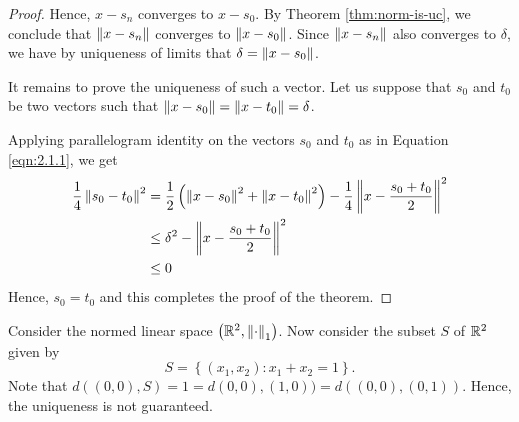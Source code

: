 \begin{proof}
     Hence, $x -s_{n}$ converges to $x- s_{0}$. By Theorem \ref{thm:norm-is-uc}, we conclude that $\left\lVert x-s_{n} \right\rVert$ converges to $\left\lVert x-s_0 \right\rVert$. Since $\left\lVert x-s_{n} \right\rVert$ also converges to $\delta$, we have by uniqueness of limits that $\delta = \left\lVert x-s_{0} \right\rVert$.

     It remains to prove the uniqueness of such a vector. Let us suppose that $s_0$ and $t_0$ be two vectors such that $\left\lVert x-s_{0} \right\rVert = \left\lVert x-t_{0} \right\rVert=\delta$.

     Applying parallelogram identity on the vectors $s_{0}$ and $t_0$ as in Equation \ref{eqn:2.1.1}, we get
\begin{align*}
	 \frac{1}{4} \left\lVert s_0 - t_0 \right\rVert^{2} &= \frac{1}{2} \left( \left\lVert x-s_{0} \right\rVert^{2} + \left\lVert x-t_0 \right\rVert^{2} \right) - \frac{1}{4} \left\lVert x - \frac{s_0 + t_0}{2} \right\rVert^{2} \\
	 & \le \delta^2 -  \left\lVert x - \frac{s_0 + t_0}{2} \right\rVert^{2} \\
	 & \le 0
     \end{align*}
     Hence, $s_0 = t_0$ and this completes the proof of the theorem.
\end{proof}

\begin{example} Consider the normed linear space $\left( \mathbb R ^{2}, \left\lVert \cdot \right\rVert _{1} \right)$. Now consider the subset $S$ of $\mathbb R ^2$ given by  $$S= \left\{ \left( x_{1} , x_{2} \right) : x_{1} + x_{2} =1 \right\}.$$ 
Note that $d \left( (0,0),S \right)=1= d\left( 0,0 \right), \left( 1,0 \right)) = d\left( \left( 0,0 \right), \left( 0,1 \right) \right)$. Hence, the uniqueness is not guaranteed.
\end{example}

